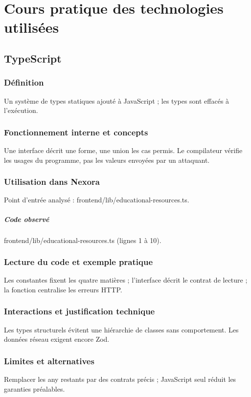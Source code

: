 \chapter{Cours pratique des technologies utilisées}
\section{TypeScript}
\subsection*{Définition}
Un système de types statiques ajouté à JavaScript ; les types sont effacés à l’exécution.

\subsection*{Fonctionnement interne et concepts}
Une interface décrit une forme, une union les cas permis. Le compilateur vérifie les usages du programme, pas les valeurs envoyées par un attaquant.

\subsection*{Utilisation dans Nexora}
Point d’entrée analysé : frontend/lib/educational-resources.ts.

\paragraph{Code observé} frontend/lib/educational-resources.ts (lignes 1 à 10).

\subsection*{Lecture du code et exemple pratique}
Les constantes fixent les quatre matières ; l’interface décrit le contrat de lecture ; la fonction centralise les erreurs HTTP.

\subsection*{Interactions et justification technique}
Les types structurels évitent une hiérarchie de classes sans comportement. Les données réseau exigent encore Zod.

\subsection*{Limites et alternatives}
Remplacer les any restants par des contrats précis ; JavaScript seul réduit les garanties préalables.

